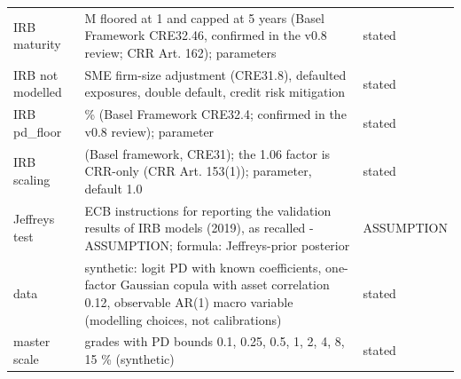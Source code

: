 \begin{table}[H]
\begin{tabular}{>{\raggedright\arraybackslash}p{3.0cm}>{\raggedright\arraybackslash}p{10.6cm}>{\raggedright\arraybackslash}p{2.1cm}}
IRB maturity & M floored at 1 and capped at 5 years (Basel Framework CRE32.46, confirmed in the v0.8 review; CRR Art. 162); parameters & stated \\
IRB not modelled & SME firm-size adjustment (CRE31.8), defaulted exposures, double default, credit risk mitigation & stated \\
IRB pd\_floor & 0.05 \% (Basel Framework CRE32.4; confirmed in the v0.8 review); parameter & stated \\
IRB scaling & 1.0 (Basel framework, CRE31); the 1.06 factor is CRR-only (CRR Art. 153(1)); parameter, default 1.0 & stated \\
Jeffreys test & ECB instructions for reporting the validation results of IRB models (2019), as recalled - ASSUMPTION; formula: Jeffreys-prior posterior & ASSUMPTION \\
data & synthetic: logit PD with known coefficients, one-factor Gaussian copula with asset correlation 0.12, observable AR(1) macro variable (modelling choices, not calibrations) & stated \\
master scale & 9 grades with PD bounds 0.1, 0.25, 0.5, 1, 2, 4, 8, 15 \% (synthetic) & stated \\
\bottomrule
\end{tabular}
\end{table}
